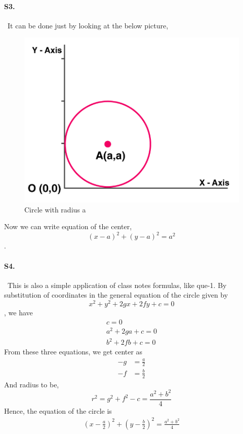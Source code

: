 \documentclass{article}
\begin{document}
\paragraph{S3.}\
It can be done just by looking at the below picture,
\begin{figure}[H]
    \centering
    \includegraphics[scale=0.3]{l2_ps2-3.png}
    \caption{Circle with radius a}
\end{figure}
Now we can write equation of the center,
\begin{equation*}
    (x-a)^2+(y-a)^2=a^2
\end{equation*}.

\paragraph{S4.}\
This is also a simple application of class notes formulas, like que-1.
By substitution of coordinates in the general equation of the  circle given by
$$x^2 + y^2 + 2gx + 2fy + c = 0$$, we have
\begin{align*}
    c = 0\\
    a^2 + 2ga + c = 0\\
    b^2 + 2fb + c = 0
\end{align*}
From these three equations, we get center as
\begin{align*}
    -g&=\frac{a}{2}\\
    -f&=\frac{b}{2}
\end{align*}
And radius to be,
\begin{equation*}
    r^2=g^2+f^2-c=\frac{a^2+b^2}{4}
\end{equation*}
Hence, the equation of the circle is
\begin{align*}
     \left(x - \frac{a}{2}\right)^2 + \left(y - \frac{b}{2}\right)^2 = \frac{a^2+b^2}{4}
\end{align*}
\end{document}
